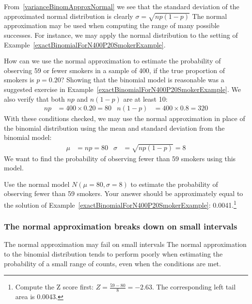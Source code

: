 From~\ref{varianceBinomApproxNormal} we see that the standard deviation
of the approximated normal distribution is clearly $\sigma  = \sqrt{np(1-p)}$
The normal approximation may be used when computing the range of many possible successes. For instance, we may apply the normal distribution to the setting of Example~\ref{exactBinomialForN400P20SmokerExample}.

\begin{example}{How can we use the normal approximation to estimate the probability of observing 59 or fewer smokers in a sample of 400, if the true proportion of smokers is $p=0.20$?} \label{approxBinomialForN400P20SmokerExample}
Showing that the binomial model is reasonable was a suggested exercise in Example~\ref{exactBinomialForN400P20SmokerExample}. We also verify that both $np$ and $n(1-p)$ are at least 10:
\begin{align*}
np&=400\times 0.20=80
&n(1-p)&=400\times 0.8=320
\end{align*}
With these conditions checked, we may use the normal approximation in place of the binomial distribution using the mean and standard deviation from the binomial model:
\begin{align*}
\mu &= np = 80
&\sigma &= \sqrt{np(1-p)} = 8
\end{align*}
We want to find the probability of observing fewer than 59 smokers using this model.
\end{example}

\begin{exercise}
Use the normal model $N(\mu=80, \sigma=8)$ to estimate the probability of observing fewer than 59 smokers. Your answer should be approximately equal to the solution of Example~\ref{exactBinomialForN400P20SmokerExample}: 0.0041.\footnote{Compute the Z score first: $Z=\frac{59 - 80}{8} = -2.63$. The corresponding left tail area is 0.0043.}
\end{exercise}



\subsubsection{The normal approximation breaks down on small intervals}

\begin{caution}
{The normal approximation may fail on small intervals}
{The normal approximation to the binomial distribution tends to perform poorly when estimating the probability of a small range of counts, even when the conditions are met.}
\end{caution}

